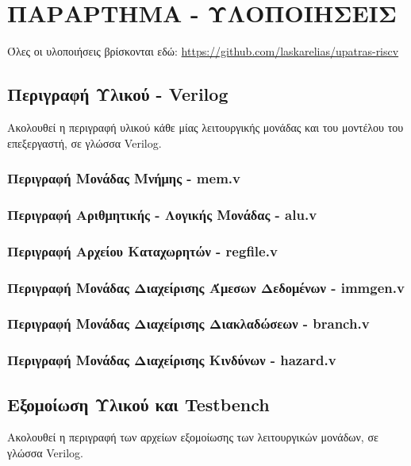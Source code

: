 \documentclass[11pt]{extarticle}
\let\stdsection\section
\renewcommand\section{\newpage\stdsection}
\begin{document}
\section{ΠΑΡΑΡΤΗΜΑ - ΥΛΟΠΟΙΗΣΕΙΣ}
Όλες οι υλοποιήσεις βρίσκονται εδώ: \href{https://github.com/laskarelias/upatras-riscv}{https://github.com/laskarelias/upatras-riscv}
\subsection{Περιγραφή Υλικού - Verilog}
Ακολουθεί η περιγραφή υλικού κάθε μίας λειτουργικής μονάδας και του μοντέλου του επεξεργαστή, σε γλώσσα Verilog.
\subsubsection{Περιγραφή Μονάδας Μνήμης - mem.v}


\subsubsection{Περιγραφή Αριθμητικής - Λογικής Μονάδας - alu.v}


\subsubsection{Περιγραφή Αρχείου Καταχωρητών - regfile.v}


\subsubsection{Περιγραφή Μονάδας Διαχείρισης Άμεσων Δεδομένων - immgen.v}


\subsubsection{Περιγραφή Μονάδας Διαχείρισης Διακλαδώσεων - branch.v}

\newpage
\subsubsection{Περιγραφή Μονάδας Διαχείρισης Κινδύνων - hazard.v}


\subsection{Εξομοίωση Υλικού και Testbench}
Ακολουθεί η περιγραφή των αρχείων εξομοίωσης των λειτουργικών μονάδων, σε γλώσσα Verilog.
\end{document}
